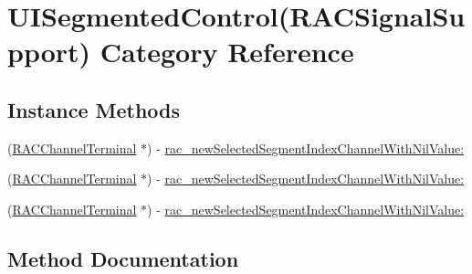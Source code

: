 \hypertarget{category_u_i_segmented_control_07_r_a_c_signal_support_08}{}\section{U\+I\+Segmented\+Control(R\+A\+C\+Signal\+Support) Category Reference}
\label{category_u_i_segmented_control_07_r_a_c_signal_support_08}
\subsection*{Instance Methods}
\begin{DoxyCompactItemize}
\item 
(\mbox{\hyperlink{interface_r_a_c_channel_terminal}{R\+A\+C\+Channel\+Terminal}} $\ast$) -\/ \mbox{\hyperlink{category_u_i_segmented_control_07_r_a_c_signal_support_08_a94173e77e84791dae3e950b9c7b06bca}{rac\+\_\+new\+Selected\+Segment\+Index\+Channel\+With\+Nil\+Value\+:}}
\item 
(\mbox{\hyperlink{interface_r_a_c_channel_terminal}{R\+A\+C\+Channel\+Terminal}} $\ast$) -\/ \mbox{\hyperlink{category_u_i_segmented_control_07_r_a_c_signal_support_08_a94173e77e84791dae3e950b9c7b06bca}{rac\+\_\+new\+Selected\+Segment\+Index\+Channel\+With\+Nil\+Value\+:}}
\item 
(\mbox{\hyperlink{interface_r_a_c_channel_terminal}{R\+A\+C\+Channel\+Terminal}} $\ast$) -\/ \mbox{\hyperlink{category_u_i_segmented_control_07_r_a_c_signal_support_08_a94173e77e84791dae3e950b9c7b06bca}{rac\+\_\+new\+Selected\+Segment\+Index\+Channel\+With\+Nil\+Value\+:}}
\end{DoxyCompactItemize}


\subsection{Method Documentation}
\mbox{\label{category_u_i_segmented_control_07_r_a_c_signal_support_08_a94173e77e84791dae3e950b9c7b06bca}} 

